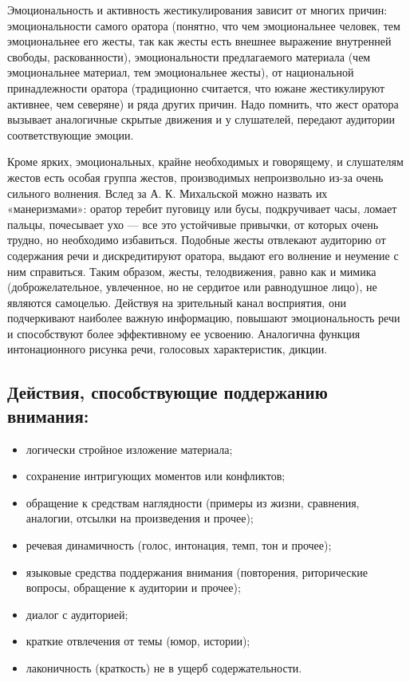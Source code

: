 Эмоциональность и активность жестикулирования зависит от многих причин: эмоциональности самого оратора (понятно, что чем эмоциональнее человек, тем эмоциональнее его жесты, так как жесты есть внешнее выражение внутренней свободы, раскованности), эмоциональности предлагаемого материала (чем эмоциональнее материал, тем эмоциональнее жесты), от национальной принадлежности оратора (традиционно считается, что южане жестикулируют активнее, чем северяне) и ряда других причин. 
Надо помнить, что жест оратора вызывает аналогичные скрытые движения и у слушателей, передают аудитории соответствующие эмоции. 

Кроме ярких, эмоциональных, крайне необходимых и говорящему, и слушателям жестов есть особая группа жестов, производимых непроизвольно из-за очень сильного волнения. Вслед за А. К. Михальской можно назвать их «манеризмами»: оратор теребит пуговицу или бусы, подкручивает часы, ломает пальцы, почесывает ухо — все это устойчивые привычки, от которых очень трудно, но необходимо избавиться. 
Подобные жесты отвлекают аудиторию от содержания речи и дискредитируют оратора, выдают его волнение и неумение с ним справиться. 
Таким образом, жесты, телодвижения, равно как и мимика (доброжелательное, увлеченное, но не сердитое или равнодушное лицо), не являются самоцелью. 
Действуя на зрительный канал восприятия, они подчеркивают наиболее важную информацию, повышают эмоциональность речи и способствуют более эффективному ее усвоению. 
Аналогична функция интонационного рисунка речи, голосовых характеристик, дикции.
\subsection*{Действия, способствующие поддержанию внимания:}
\begin{itemize}
\item логически стройное изложение материала;
\item сохранение интригующих моментов или конфликтов;
\item обращение к средствам наглядности (примеры из жизни, сравнения, аналогии, отсылки на произведения и прочее);
\item речевая динамичность (голос, интонация, темп, тон и прочее);
\item языковые средства поддержания внимания (повторения, риторические вопросы, обращение к аудитории и прочее);
\item диалог с аудиторией;
\item краткие отвлечения от темы (юмор, истории);
\item лаконичность (краткость) не в ущерб содержательности.
\end{itemize}
